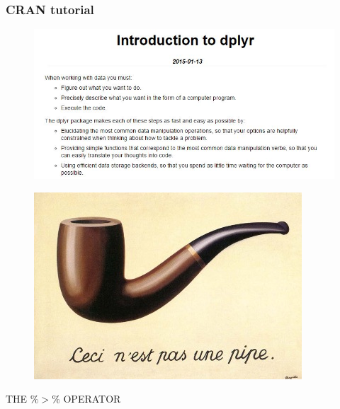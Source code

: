 \documentclass{beamer}
\begin{document}
	\begin{frame}
		\frametitle{CRAN tutorial}
\begin{figure}
\centering
\includegraphics[width=1.15\linewidth]{images/introdplyr}

\end{figure}

		
	\end{frame}
	
	\begin{frame}
		\begin{figure}
			\centering
			\includegraphics[width=0.99\linewidth]{images/pipe}
			
		\end{figure}
		\begin{center}
			{\huge THE $ \%>\% $ OPERATOR}
		\end{center}
		
		
		
	\end{frame}
	
\end{document}
